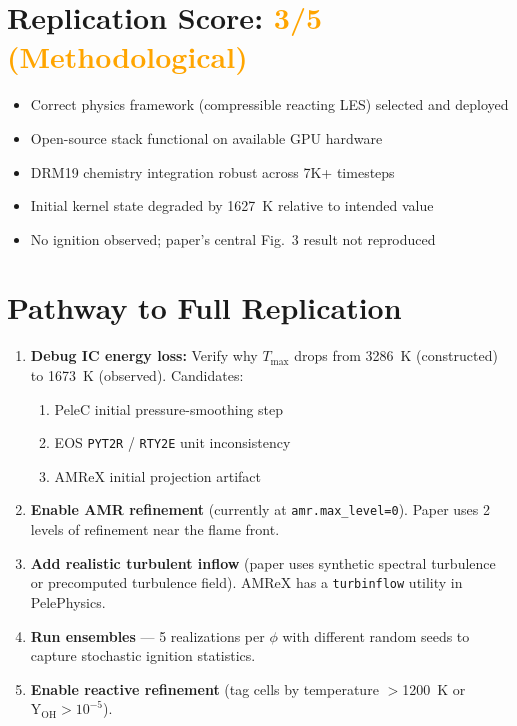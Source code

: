 \documentclass[11pt,a4paper]{article}
\begin{document}
\section{Replication Score: \textcolor{orange}{3/5 (Methodological)}}
\begin{itemize}[leftmargin=*]
\item[\textcolor{darkgreen}{\checkmark}] Correct physics framework (compressible reacting LES) selected and deployed
\item[\textcolor{darkgreen}{\checkmark}] Open-source stack functional on available GPU hardware
\item[\textcolor{darkgreen}{\checkmark}] DRM19 chemistry integration robust across 7K+ timesteps
\item[\textcolor{oursred}{\xmark}] Initial kernel state degraded by \SI{1627}{K} relative to intended value
\item[\textcolor{oursred}{\xmark}] No ignition observed; paper's central Fig.~3 result not reproduced
\end{itemize}

\section{Pathway to Full Replication}

\begin{enumerate}[leftmargin=*]
\item \textbf{Debug IC energy loss:} Verify why $T_{\max}$ drops from 3286~K (constructed) to 1673~K (observed). Candidates:
    \begin{enumerate}[label=(\alph*)]
    \item PeleC initial pressure-smoothing step
    \item EOS \texttt{PYT2R} / \texttt{RTY2E} unit inconsistency
    \item AMReX initial projection artifact
    \end{enumerate}
\item \textbf{Enable AMR refinement} (currently at \texttt{amr.max\_level=0}). Paper uses 2 levels of refinement near the flame front.
\item \textbf{Add realistic turbulent inflow} (paper uses synthetic spectral turbulence or precomputed turbulence field). AMReX has a \texttt{turbinflow} utility in PelePhysics.
\item \textbf{Run ensembles} — 5 realizations per $\phi$ with different random seeds to capture stochastic ignition statistics.
\item \textbf{Enable reactive refinement} (tag cells by temperature $>$\SI{1200}{K} or $\mathrm{Y_{OH}} > 10^{-5}$).
\end{enumerate}
\end{document}
